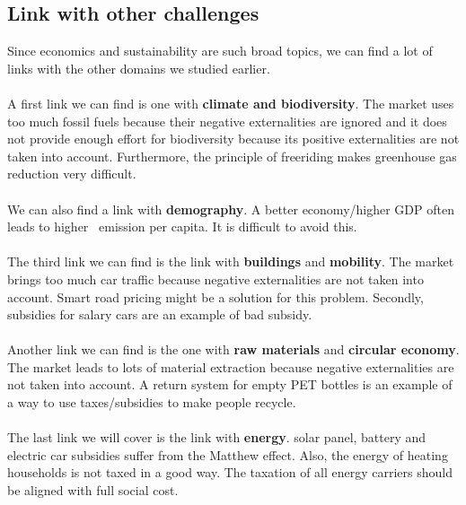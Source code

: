 \documentclass[../summary.tex]{subfiles}
\begin{document}
\subsection{Link with other challenges}
Since economics and sustainability are such broad topics, we can find a lot of links with the other domains we studied earlier.
\\\\
A first link we can find is one with \textbf{climate and biodiversity}. The market uses too much fossil fuels because their negative externalities are ignored and it does not provide enough effort for biodiversity because its positive externalities are not taken into account. Furthermore, the principle of freeriding makes greenhouse gas reduction very difficult.
\\\\
We can also find a link with \textbf{demography}. A better economy/higher GDP often leads to higher \COtwo\ emission per capita. It is difficult to avoid this.
\\\\
The third link we can find is the link with \textbf{buildings} and \textbf{mobility}. The market brings too much car traffic because negative externalities are not taken into account. Smart road pricing might be a solution for this problem. Secondly, subsidies for salary cars are an example of bad subsidy.
\\\\
Another link we can find is the one with \textbf{raw materials} and \textbf{circular economy}. The market leads to lots of material extraction because negative externalities are not taken into account. A return system for empty PET bottles is an example of a way to use taxes/subsidies to make people recycle.
\\\\
The last link we will cover is the link with \textbf{energy}. solar panel, battery and electric car subsidies suffer from the Matthew effect. Also, the energy of heating households is not taxed in a good way. The taxation of all energy carriers should be aligned with full social cost.
\end{document}
